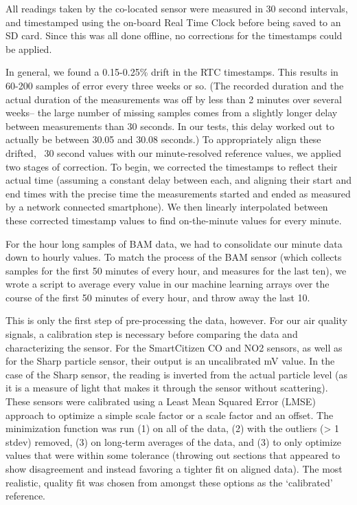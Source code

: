 All readings taken by the co-located sensor were measured in 30 second intervals, and timestamped using the on-board Real Time Clock before being saved to an SD card.  Since this was all done offline, no corrections for the timestamps could be applied.

In general, we found a 0.15-0.25\% drift in the RTC timestamps.  This results in 60-200 samples of error every three weeks or so. (The recorded duration and the actual duration of the measurements was off by less than 2 minutes over several weeks-- the large number of missing samples comes from a slightly longer delay between measurements than 30 seconds.  In our tests, this delay worked out to actually be between 30.05 and 30.08 seconds.)    To appropriately align these drifted, ~30 second values with our minute-resolved reference values, we applied two stages of correction.  To begin, we corrected the timestamps to reflect their actual time (assuming a constant delay between each, and aligning their start and end times with the precise time the measurements started and ended as measured by a network connected smartphone).  We then linearly interpolated between these corrected timestamp values to find on-the-minute values for every minute.

For the hour long samples of BAM data, we had to consolidate our minute data down to hourly values.  To match the process of the BAM sensor (which collects samples for the first 50 minutes of every hour, and measures for the last ten), we wrote a script to average every value in our machine learning arrays over the course of the first 50 minutes of every hour, and throw away the last 10.

This is only the first step of pre-processing the data, however.  For our air quality signals, a calibration step is necessary before comparing the data and characterizing the sensor.  For the SmartCitizen CO and NO2 sensors, as well as for the Sharp particle sensor, their output is an uncalibrated mV value.  In the case of the Sharp sensor, the reading is inverted from the actual particle level (as it is a measure of light that makes it through the sensor without scattering).  These sensors were calibrated using a Least Mean Squared Error (LMSE) approach to optimize a simple scale factor or a scale factor and an offset.  The minimization function was run (1) on all of the data, (2) with the outliers (> 1 stdev) removed, (3) on long-term averages of the data, and (3) to only optimize values that were within some tolerance (throwing out sections that appeared to show disagreement and instead favoring a tighter fit on aligned data).  The most realistic, quality fit was chosen from amongst these options as the `calibrated' reference.

